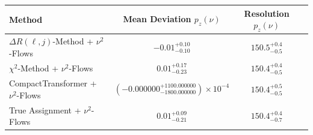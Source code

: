     \begin{tabular}{lccc}
        \toprule
        Method & Mean Deviation $p_{z}(\nu)$ & Resolution $p_{z}(\nu)$ \\
        \midrule
        $\Delta R(\ell,j)$-Method + $\nu^2$-Flows & $-0.01^{+0.10}_{-0.10}$ & $150.5^{+0.4}_{-0.5}$ \\
        $\chi^2$-Method + $\nu^2$-Flows & $0.01^{+0.17}_{-0.23}$ & $150.4^{+0.4}_{-0.5}$ \\
        CompactTransformer + $\nu^2$-Flows & $(-0.000000^{+1100.000000}_{-1800.000000})\times 10^{-4}$ & $150.4^{+0.5}_{-0.5}$ \\
        True Assignment + $\nu^2$-Flows & $0.01^{+0.09}_{-0.21}$ & $150.4^{+0.4}_{-0.7}$ \\
        \bottomrule
    \end{tabular}